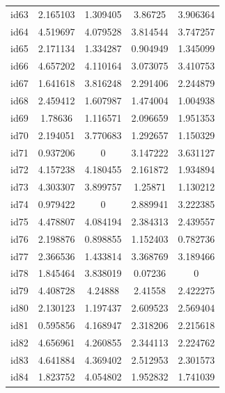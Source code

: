 \documentclass[entropy,article,submit,moreauthors,LaTeX and dvi2pdf]{Definitions/mdpi}
\begin{document}
\begin{center}
\begin{longtable}{ccccc}
id63      & 2.165103  & 1.309405       & 3.86725           & 3.906364          \\
id64      & 4.519697  & 4.079528       & 3.814544          & 3.747257          \\
id65      & 2.171134  & 1.334287       & 0.904949          & 1.345099          \\
id66      & 4.657202  & 4.110164       & 3.073075          & 3.410753          \\
id67      & 1.641618  & 3.816248       & 2.291406          & 2.244879          \\
id68      & 2.459412  & 1.607987       & 1.474004          & 1.004938          \\
id69      & 1.78636   & 1.116571       & 2.096659          & 1.951353          \\
id70      & 2.194051  & 3.770683       & 1.292657          & 1.150329          \\
id71      & 0.937206  & 0              & 3.147222          & 3.631127          \\
id72      & 4.157238  & 4.180455       & 2.161872          & 1.934894          \\
id73      & 4.303307  & 3.899757       & 1.25871           & 1.130212          \\
id74      & 0.979422  & 0              & 2.889941          & 3.222385          \\
id75      & 4.478807  & 4.084194       & 2.384313          & 2.439557          \\
id76      & 2.198876  & 0.898855       & 1.152403          & 0.782736          \\
id77      & 2.366536  & 1.433814       & 3.368769          & 3.189466          \\
id78      & 1.845464  & 3.838019       & 0.07236           & 0                 \\
id79      & 4.408728  & 4.24888        & 2.41558           & 2.422275          \\
id80      & 2.130123  & 1.197437       & 2.609523          & 2.569404          \\
id81      & 0.595856  & 4.168947       & 2.318206          & 2.215618          \\
id82      & 4.656961  & 4.260855       & 2.344113          & 2.224762          \\
id83      & 4.641884  & 4.369402       & 2.512953          & 2.301573          \\
id84      & 1.823752  & 4.054802       & 1.952832          & 1.741039          \\

\end{longtable}
\end{center}
\end{document}
